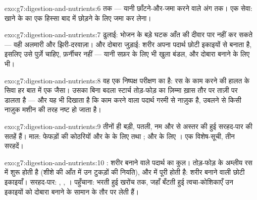 \begin{solution}{exo:g7:digestion-and-nutrients:6}
 तक --- यानी छाँटने-और-जमा करने वाले अंग तक। एक सेवा: खाने के
 का एक हिस्सा बाद में छोड़ने के लिए जमा कर लेना।
\end{solution}

\begin{solution}{exo:g7:digestion-and-nutrients:7}
ढुलाई: भोजन के बड़े घटक आँत की दीवार पार नहीं कर सकते --- वही अलमारी
और झिरी-दरवाज़ा। और दोबारा जुड़ाई: शरीर अपना पदार्थ छोटी इकाइयों से
बनाता है, इसलिए उसे पुर्ज़े चाहिए, फ़र्नीचर नहीं --- यानी सफ़र के लिए
भी खुला बंडल, और दोबारा बनाने के लिए भी।
\end{solution}

\begin{solution}{exo:g7:digestion-and-nutrients:8}
वह एक निष्पक्ष परीक्षण का  है: रस के काम करने की हालत के सिवा
हर बात में एक जैसा। उसका बिना बदला स्टार्च तोड़-फोड़ का ज़िम्मा ख़ास
तौर पर ताज़ी  पर डालता है --- और यह भी दिखाता है कि काम करने वाला
पदार्थ गरमी से नाज़ुक है, उबलने से किसी नाज़ुक मशीन की तरह नष्ट हो
जाता है।
\end{solution}

\begin{solution}{exo:g7:digestion-and-nutrients:9}
तीनों ही बड़ी, पतली, नम और  से अस्तर की हुई सरहद-पार की सतहें हैं।
माल: फेफड़ों की कोठरियों और  के  के लिए  तथा ; और  के लिए । एक विशेष-सूची, तीन सरहदें।
\end{solution}

\begin{solution}{exo:g7:digestion-and-nutrients:10}
: शरीर बनाने वाले पदार्थ का कुल। तोड़-फोड़  के अम्लीय रस में
शुरू होती है (शीशे की आँत में उन टुकड़ों की नियति), और  में
पूरी होती है: शरीर बनाने वाली छोटी इकाइयाँ। सरहद-पार: , ,
। पहुँचाना: भरती हुई खरोंच तक, जहाँ बँटती हुई त्वचा-कोशिकाएँ उन
इकाइयों को दोबारा बनाने के सामान के तौर पर लेती हैं।
\end{solution}

